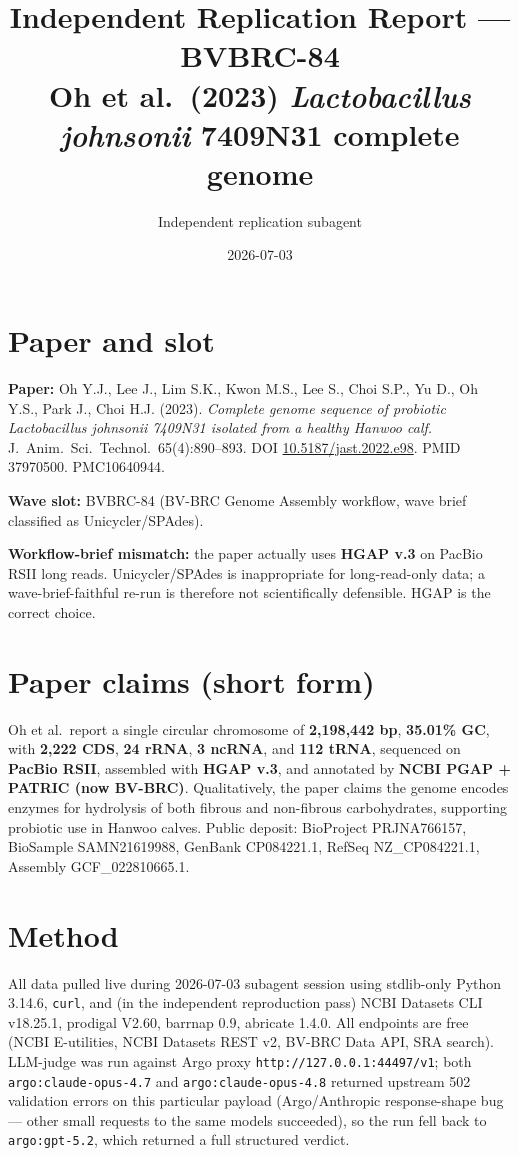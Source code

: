 \documentclass[11pt,letterpaper]{article}
\title{Independent Replication Report --- BVBRC-84\\
\large Oh et al.\ (2023) \emph{Lactobacillus johnsonii} 7409N31 complete genome}
\author{Independent replication subagent}
\date{2026-07-03}
\begin{document}
\maketitle

\section{Paper and slot}

\textbf{Paper:} Oh Y.J., Lee J., Lim S.K., Kwon M.S., Lee S., Choi S.P., Yu D., Oh Y.S., Park J., Choi H.J. (2023). \emph{Complete genome sequence of probiotic Lactobacillus johnsonii 7409N31 isolated from a healthy Hanwoo calf.} J.\ Anim.\ Sci.\ Technol.\ 65(4):890--893. DOI \href{https://doi.org/10.5187/jast.2022.e98}{10.5187/jast.2022.e98}. PMID 37970500. PMC10640944.

\textbf{Wave slot:} BVBRC-84 (BV-BRC Genome Assembly workflow, wave brief classified as Unicycler/SPAdes).

\textbf{Workflow-brief mismatch:} the paper actually uses \textbf{HGAP v.3} on PacBio RSII long reads. Unicycler/SPAdes is inappropriate for long-read-only data; a wave-brief-faithful re-run is therefore not scientifically defensible. HGAP is the correct choice.

\section{Paper claims (short form)}

Oh et al.\ report a single circular chromosome of \textbf{2{,}198{,}442 bp}, \textbf{35.01\% GC}, with \textbf{2{,}222 CDS}, \textbf{24 rRNA}, \textbf{3 ncRNA}, and \textbf{112 tRNA}, sequenced on \textbf{PacBio RSII}, assembled with \textbf{HGAP v.3}, and annotated by \textbf{NCBI PGAP + PATRIC (now BV-BRC)}. Qualitatively, the paper claims the genome encodes enzymes for hydrolysis of both fibrous and non-fibrous carbohydrates, supporting probiotic use in Hanwoo calves. Public deposit: BioProject PRJNA766157, BioSample SAMN21619988, GenBank CP084221.1, RefSeq NZ\_CP084221.1, Assembly GCF\_022810665.1.

\section{Method}

All data pulled live during 2026-07-03 subagent session using stdlib-only Python 3.14.6, \texttt{curl}, and (in the independent reproduction pass) NCBI Datasets CLI v18.25.1, prodigal V2.60, barrnap 0.9, abricate 1.4.0. All endpoints are free (NCBI E-utilities, NCBI Datasets REST v2, BV-BRC Data API, SRA search). LLM-judge was run against Argo proxy \texttt{http://127.0.0.1:44497/v1}; both \texttt{argo:claude-opus-4.7} and \texttt{argo:claude-opus-4.8} returned upstream 502 validation errors on this particular payload (Argo/Anthropic response-shape bug --- other small requests to the same models succeeded), so the run fell back to \texttt{argo:gpt-5.2}, which returned a full structured verdict.
\end{document}

